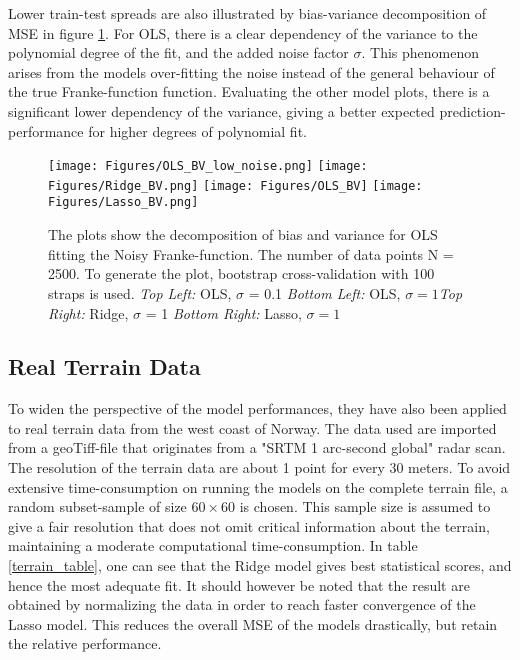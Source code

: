 \documentclass[...,numrefs]{wiley-article}
\begin{document}
\noident Lower train-test spreads are also illustrated by bias-variance decomposition of MSE in figure \ref{BV}. For OLS, there is a clear dependency of the variance to the polynomial degree of the fit, and the added noise factor $\sigma$. This phenomenon arises from the models over-fitting the noise instead of the general behaviour of the true Franke-function function. Evaluating the other model plots, there is a significant lower dependency of the variance, giving a better expected prediction-performance for higher degrees of polynomial fit. 
 



\begin{figure}[h!]
    \centering
    \texttt{[image: Figures/OLS\_BV\_low\_noise.png]}
    \texttt{[image: Figures/Ridge\_BV.png]}
    \texttt{[image: Figures/OLS\_BV]}
    \texttt{[image: Figures/Lasso\_BV.png]}
    \caption[Bias-Variance-Trade Off]{The plots show the decomposition of bias and variance for OLS fitting the Noisy Franke-function. The number of data points N = 2500. To generate the plot, bootstrap cross-validation with 100 straps is used. \textit{Top Left:} OLS, $\sigma$ = 0.1 \textit{Bottom Left:} OLS, $\sigma=1$\textit{Top Right:} Ridge, $\sigma$ = 1 \textit{Bottom Right:} Lasso, $\sigma= 1$}
   \label{BV}
\end{figure}

\clearpage

\subsection{Real Terrain Data}

To widen the perspective of the model performances, they have also been applied to real terrain data from the west coast of Norway. The data used are imported from a geoTiff-file that originates from a "SRTM 1 arc-second global" radar scan. The resolution of the terrain data are about 1 point for every 30 meters. To avoid extensive time-consumption on running the models on the complete terrain file, a random subset-sample of size $60\times{60}$ is chosen. This sample size is assumed to give a fair resolution that does not omit critical information about the terrain, maintaining a moderate computational time-consumption.
\newline
\newline
\noident In table \ref{terrain_table}, one can see that the Ridge model gives best statistical scores, and hence the most adequate fit. It should however be noted that the result are obtained by normalizing the data in order to reach faster convergence of the Lasso model. This reduces the overall MSE of the models drastically, but retain the relative performance. 
\end{document}

